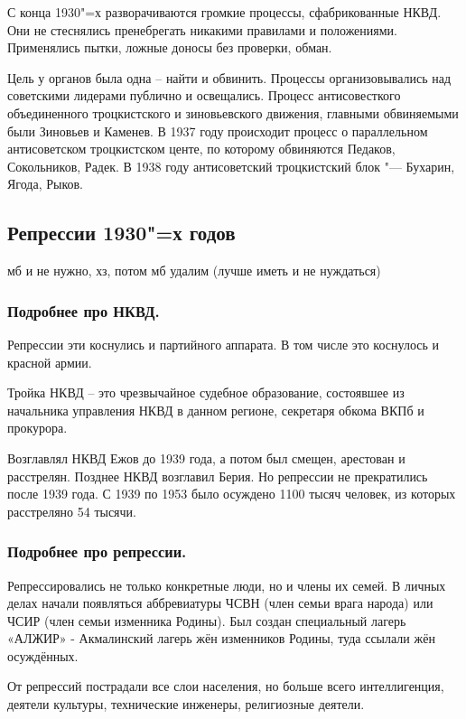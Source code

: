 С конца 1930"=х разворачиваются громкие процессы, сфабрикованные НКВД. Они не стеснялись пренебрегать никакими правилами и положениями. Применялись пытки, ложные доносы без проверки, обман. 

Цель у органов была одна – найти и обвинить. Процессы организовывались над советскими лидерами публично и освещались. Процесс антисовесткого объединенного троцкистского и зиновьевского движения, главными обвиняемыми были Зиновьев и Каменев. В 1937 году происходит процесс о параллельном антисоветском троцкистском центе, по которому обвиняются Педаков, Сокольников, Радек. В 1938 году антисоветский троцкистский блок "--- Бухарин, Ягода, Рыков.

\subsection{Репрессии 1930"=х годов}

мб и не нужно, хз, потом мб удалим (лучше иметь и не нуждаться)

\subsubsection{\textbf{Подробнее про НКВД.}}

Репрессии эти коснулись и партийного аппарата. В том числе это коснулось и красной армии.

Тройка НКВД – это чрезвычайное судебное образование, состоявшее из начальника управления НКВД в данном регионе, секретаря обкома ВКПб и прокурора.  

Возглавлял НКВД Ежов до 1939 года, а потом был смещен, арестован и расстрелян. Позднее НКВД возглавил Берия. Но репрессии не прекратились после 1939 года. С 1939 по 1953 было осуждено 1100 тысяч человек, из которых расстреляно 54 тысячи. 

\subsubsection{\textbf{Подробнее про репрессии.}}

Репрессировались не только конкретные люди, но и члены их семей. В личных делах начали появляться аббревиатуры ЧСВН (член семьи врага народа) или ЧСИР (член семьи изменника Родины). Был создан специальный лагерь «АЛЖИР» - Акмалинский лагерь жён изменников Родины, туда ссылали жён осуждённых.

От репрессий пострадали все слои населения, но больше всего интеллигенция, деятели культуры, технические инженеры, религиозные деятели. 

